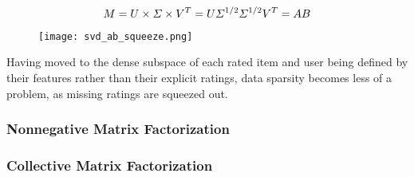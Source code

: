 \begin{equation} \label{eq:svd_AB_squeezing}
	\centering
	M = U\times \Sigma \times V^T = U\Sigma^{1/2} \Sigma^{1/2}V^T = AB
\end{equation}

\begin{figure}
	\centering
	\texttt{[image: svd\_ab\_squeeze.png]}
\end{figure}

Having moved to the dense subspace of each rated item and user being defined by their features rather than their explicit ratings, data sparsity becomes less of a problem, as missing ratings are squeezed out.




\subsubsection{Nonnegative Matrix Factorization}


\subsubsection{Collective Matrix Factorization}
